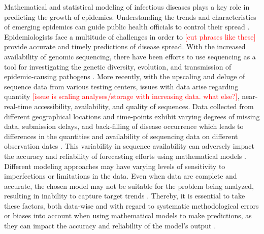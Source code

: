 \documentclass[11pt,oneside,letterpaper]{article}
\def\jhc#1{\textcolor{red}{[#1]}}
\begin{document}
Mathematical and statistical modeling of infectious diseases plays a key role in predicting the growth of epidemics.
Understanding the trends and characteristics of emerging epidemics can guide public health officials to control their spread \cite{ding_value_2021}.
Epidemiologists face a multitude of challenges in order to \jhc{cut phrases like these} provide accurate and timely predictions of disease spread.
With the increased availability of genomic sequencing, there have been efforts to use sequencing as a tool for investigating the genetic diversity, evolution, and transmission of epidemic-causing pathogens \cite{gire_genomic_2014,zhou_pneumonia_2020}.
More recently, with the upscaling and deluge of sequence data from various testing centers, issues with data arise regarding quantity \jhc{issue is scaling analyses/storage with increasing data. what else?}, near-real-time accessibility, availability, and quality of sequences.
Data collected from different geographical locations and time-points exhibit varying degrees of missing data, submission delays, and back-filling of disease occurrence which leads to differences in the quantities and availability of sequencing data on different observation dates \cite{crepey_challenges_2022}.
This variability in sequence availability can adversely impact the accuracy and reliability of forecasting efforts using mathematical models \cite{suchard_bayesian_2018}.
Different modeling approaches may have varying levels of sensitivity to imperfections or limitations in the data.
Even when data are complete and accurate, the chosen model may not be suitable for the problem being analyzed, resulting in inability to capture target trends \cite{gelman_bayesian_2013}.
Thereby, it is essential to take these factors, both data-wise and with regard to systematic methodological errors or biases into account when using mathematical models to make predictions, as they can impact the accuracy and reliability of the model's output \cite{crepey_challenges_2022}.
\end{document}

